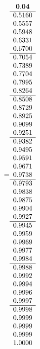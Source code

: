 =\hbox{$\begin{array}{c}
\bf 0.04 
 \\ \hline 
  0.5160 \\ 
  0.5557 \\ 
  0.5948 \\ 
  0.6331 \\ 
  0.6700
 \\ \hline 
  0.7054 \\ 
  0.7389 \\ 
  0.7704 \\ 
  0.7995 \\ 
  0.8264
 \\ \hline 
  0.8508 \\ 
  0.8729 \\ 
  0.8925 \\ 
  0.9099 \\ 
  0.9251
 \\ \hline 
  0.9382 \\ 
  0.9495 \\ 
  0.9591 \\ 
  0.9671 \\ 
  0.9738
 \\ \hline 
  0.9793 \\ 
  0.9838 \\ 
  0.9875 \\ 
  0.9904 \\ 
  0.9927
 \\ \hline 
  0.9945 \\ 
  0.9959 \\ 
  0.9969 \\ 
  0.9977 \\ 
  0.9984
 \\ \hline 
  0.9988 \\ 
  0.9992 \\ 
  0.9994 \\ 
  0.9996 \\ 
  0.9997
 \\ \hline 
  0.9998 \\ 
  0.9999 \\ 
  0.9999 \\ 
  0.9999 \\ 
  1.0000
 \end{array}$}
